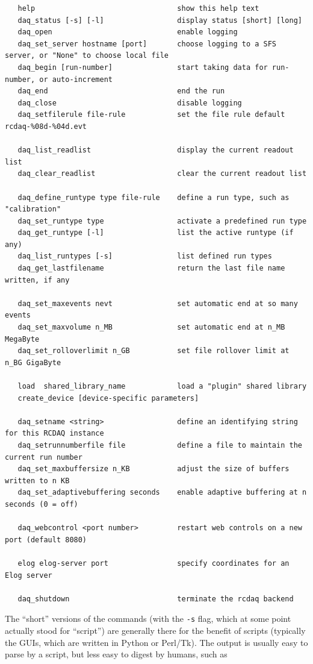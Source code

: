 \documentclass{article}[11pt]
\begin{document}
\begin{verbatim}
   help                                 show this help text
   daq_status [-s] [-l]                 display status [short] [long]
   daq_open                             enable logging
   daq_set_server hostname [port]       choose logging to a SFS server, or "None" to choose local file
   daq_begin [run-number]             	start taking data for run-number, or auto-increment
   daq_end                              end the run
   daq_close                            disable logging
   daq_setfilerule file-rule            set the file rule default rcdaq-%08d-%04d.evt

   daq_list_readlist                    display the current readout list
   daq_clear_readlist                   clear the current readout list

   daq_define_runtype type file-rule    define a run type, such as "calibration"
   daq_set_runtype type                 activate a predefined run type
   daq_get_runtype [-l]                 list the active runtype (if any)
   daq_list_runtypes [-s]               list defined run types
   daq_get_lastfilename                 return the last file name written, if any

   daq_set_maxevents nevt               set automatic end at so many events
   daq_set_maxvolume n_MB               set automatic end at n_MB MegaByte
   daq_set_rolloverlimit n_GB           set file rollover limit at n_BG GigaByte

   load  shared_library_name            load a "plugin" shared library
   create_device [device-specific parameters]

   daq_setname <string>                 define an identifying string for this RCDAQ instance
   daq_setrunnumberfile file            define a file to maintain the current run number
   daq_set_maxbuffersize n_KB           adjust the size of buffers written to n KB
   daq_set_adaptivebuffering seconds    enable adaptive buffering at n seconds (0 = off)

   daq_webcontrol <port number>         restart web controls on a new port (default 8080)

   elog elog-server port                specify coordinates for an Elog server

   daq_shutdown                         terminate the rcdaq backend
\end{verbatim} 

The ``short'' versions of the commands (with the \verb|-s| flag, which
at some point actually stood for ``script'') are generally there for
the benefit of scripts (typically the GUIs, which are written in
Python or Perl/Tk). The output is  usually easy to parse by a script, but less easy
to digest by humans, such as
\end{document}
